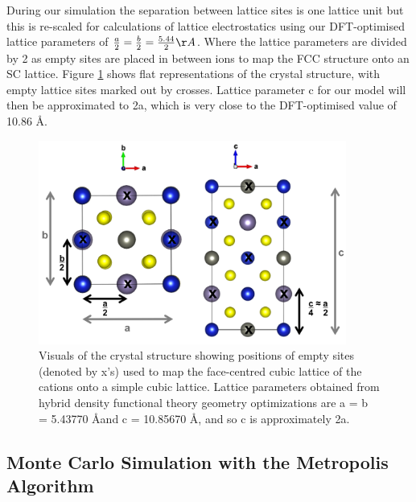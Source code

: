 
During our simulation the separation between lattice sites is one lattice unit but this is re-scaled for calculations of lattice electrostatics using our DFT-optimised lattice parameters of $\frac{a}{2}  = \frac{b}{2} = \frac{5.44}{2} \AA$. Where the lattice parameters are divided by 2 as empty sites are placed in between ions to map the FCC structure onto an SC lattice. Figure \ref{CZTS_lattice_scaling} shows flat representations of the crystal structure, with empty lattice sites marked out by crosses. Lattice parameter c for our model will then be approximated to 2a, which is very close to the DFT-optimised value of 10.86 \AA .  

\begin{figure}[h!]
  \centering
    \includegraphics[width=0.9\textwidth]{figures/CZTS_lattice_scaling.png}
    \caption{Visuals of the { \CZTS } crystal structure showing positions of empty sites (denoted by x's) used to map the face-centred cubic lattice of the cations onto a simple cubic lattice. Lattice parameters obtained from hybrid density functional theory geometry optimizations are a = b = 5.43770 \AA and c = 10.85670 \AA, and so c is approximately 2a.}
  \label{CZTS_lattice_scaling}
\end{figure}


\subsection{Monte Carlo Simulation with the Metropolis Algorithm}

